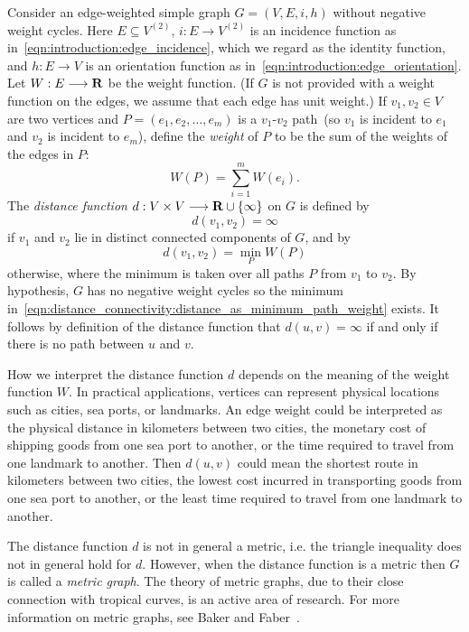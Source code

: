 Consider an edge-weighted simple graph $G = (V,E,i,h)$ without
negative weight cycles. Here $E \subseteq V^{(2)}$, $i: E \to V^{(2)}$
is an incidence function as in~\eqref{eqn:introduction:edge_incidence},
which we regard as the identity function, and $h: E \to V$ is an
orientation function as in~\eqref{eqn:introduction:edge_orientation}.
Let $W: E \longrightarrow \mathbf{R}$ be the weight function. (If $G$ is not provided with
a weight function on the edges, we assume that each edge has unit
weight.) If $v_1, v_2 \in V$ are two vertices and
$P = (e_1, e_2, \dots, e_m)$ is a $v_1$-$v_2$ path~(so $v_1$ is
incident to $e_1$ and $v_2$ is incident to $e_m$), define the
\emph{weight} of $P$ to be the sum of the weights
of the edges in $P$:
\[
W(P)
=
\sum_{i=1}^m W(e_i).
\]
The \emph{distance function}
$d: V \times V \longrightarrow \mathbf{R} \cup \{\infty\}$ on $G$ is defined by
\[
d(v_1, v_2)
=
\infty
\]
if $v_1$ and $v_2$ lie in distinct connected components of $G$, and by
\begin{equation}
\label{eqn:distance_connectivity:distance_as_minimum_path_weight}
d(v_1, v_2)
=
\min_P W(P)
\end{equation}
otherwise, where the minimum is taken over all paths $P$ from $v_1$ to
$v_2$. By hypothesis, $G$ has no negative weight cycles so the minimum
in~\eqref{eqn:distance_connectivity:distance_as_minimum_path_weight}
exists. It follows by definition of the distance function that
$d(u,v) = \infty$ if and only if there is no path between $u$ and $v$.

How we interpret the distance function $d$ depends on the meaning of
the weight function $W$. In practical applications, vertices can
represent physical locations such as cities, sea ports, or
landmarks. An edge weight could be interpreted as the physical
distance in kilometers between two cities, the monetary cost of
shipping goods from one sea port to another, or the time required to
travel from one landmark to another. Then $d(u,v)$ could mean the
shortest route in kilometers between two cities, the lowest cost
incurred in transporting goods from one sea port to another, or the
least time required to travel from one landmark to another.

The distance function $d$ is not in general a
metric, i.e. the triangle
inequality does not in general hold for
$d$. However, when the distance function is a metric then $G$ is
called a \emph{metric graph}. The theory of
metric graphs, due to their close connection with
tropical curves, is an active area of research. For more information
on metric graphs, see Baker and
Faber~\cite{BakerFaber2006}.


